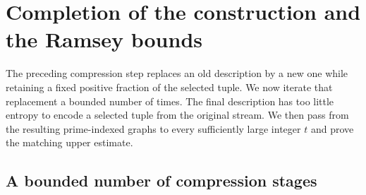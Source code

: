 \section{Completion of the construction and the Ramsey bounds}
\label{end:section}

The preceding compression step replaces an old description by a new
one while retaining a fixed positive fraction of the selected tuple.
We now iterate that replacement a bounded number of times. The final
description has too little entropy to encode a selected tuple from the
original stream. We then pass from the resulting prime-indexed graphs
to every sufficiently large integer $t$ and prove the matching upper
estimate.

\subsection{A bounded number of compression stages}
\label{end:construction}

